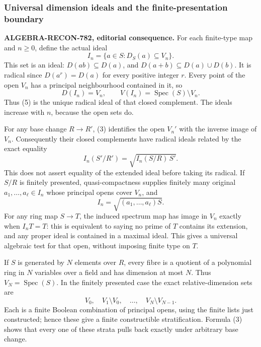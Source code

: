 \subsubsection{Universal dimension ideals and the finite-presentation boundary}\label{universal-dimension-ideals-and-the-finite-presentation-boundary}

\textbf{ALGEBRA-RECON-782, editorial consequence.} For each finite-type map and \(n\geq0\), define the actual ideal \[
 I_n=\{a\in S:D_S(a)\subseteq V_n\}.
 \tag{5}
\] This set is an ideal: \(D(ab)\subseteq D(a)\), and \(D(a+b)\subseteq D(a)\cup D(b)\). It is radical since \(D(a^r)=D(a)\) for every positive integer \(r\). Every point of the open \(V_n\) has a principal neighbourhood contained in it, so \[
 D(I_n)=V_n,\qquad V(I_n)=\operatorname{Spec}(S)\setminus V_n.
\] Thus (5) is the unique radical ideal of that closed complement. The ideals increase with \(n\), because the open sets do.

For any base change \(R\to R'\), (3) identifies the open \(V_n'\) with the inverse image of \(V_n\). Consequently their closed complements have radical ideals related by the exact equality \[
 I_n(S'/R')=\sqrt{I_n(S/R)\,S'}.
 \tag{6}
\] This does not assert equality of the extended ideal before taking its radical. If \(S/R\) is finitely presented, quasi-compactness supplies finitely many original \(a_1,\ldots,a_\ell\in I_n\) whose principal opens cover \(V_n\), and \[
 I_n=\sqrt{(a_1,\ldots,a_\ell)S}.
\] For any ring map \(S\to T\), the induced spectrum map has image in \(V_n\) exactly when \(I_nT=T\): this is equivalent to saying no prime of \(T\) contains its extension, and any proper ideal is contained in a maximal ideal. This gives a universal algebraic test for that open, without imposing finite type on \(T\).

If \(S\) is generated by \(N\) elements over \(R\), every fibre is a quotient of a polynomial ring in \(N\) variables over a field and has dimension at most \(N\). Thus \(V_N=\operatorname{Spec}(S)\). In the finitely presented case the exact relative-dimension sets are \[
 V_0,\quad V_1\setminus V_0,\quad\ldots,\quad V_N\setminus V_{N-1}.
\] Each is a finite Boolean combination of principal opens, using the finite lists just constructed; hence these give a finite constructible stratification. Formula (3) shows that every one of these strata pulls back exactly under arbitrary base change.


